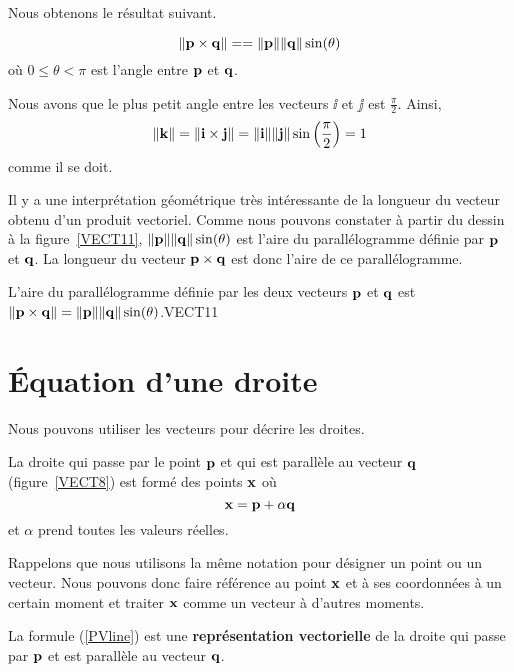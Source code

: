 {Nous obtenons le résultat suivant.

\begin{focus}{\prp}
\[
\| \mathbf{p} \times \mathbf{q} \| = 
= \|\mathbf{p}\| \|\mathbf{q}\| \sin(\theta)
\]
où $0 \leq \theta < \pi$ est l'angle entre $\mathbf{p}$ et $\mathbf{q}$.
\end{focus}

\begin{egg}
Nous avons que le plus petit angle entre les vecteurs $\ii$ et $\jj$ est
$\displaystyle \frac{\pi}{2}$.  Ainsi,
\[
\|\mathbf{k} \| = \| \mathbf{i} \times \mathbf{j} \| = \|\mathbf{i} \| \| \mathbf{j} \|
\sin \left(\frac{\pi}{2}\right) = 1
\]
comme il se doit.
\end{egg}

Il y a une interprétation géométrique très intéressante de la longueur du
vecteur obtenu d'un produit vectoriel.  Comme nous pouvons constater à
partir du dessin à la figure~\ref{VECT11},
$\|\mathbf{p}\| \|\mathbf{q}\| \sin(\theta)$ est
l'aire du parallélogramme définie par $\mathbf{p}$ et $\mathbf{q}$.  La
longueur du vecteur $\mathbf{p}\times \mathbf{q}$ est donc l'aire de ce
parallélogramme.

{L'aire du parallélogramme définie par les deux vecteurs $\mathbf{p}$ et
$\mathbf{q}$ est
$\|\mathbf{p}\times \mathbf{q}\| = \|\mathbf{p}\| \|\mathbf{q}\| \sin(\theta)$.}{VECT11}

\section{Équation d'une droite \eng}

Nous pouvons utiliser les vecteurs pour décrire les droites.

La droite qui passe par le point $\mathbf{p}$ et qui est parallèle au
vecteur $\mathbf{q}$ (figure~\ref{VECT8}) est formé des points
$\mathbf{x}$ où 
\begin{equation}\label{PVline}
\mathbf{x} = \mathbf{p} + \alpha \mathbf{q}
\end{equation}
et $\alpha$ prend toutes les valeurs réelles.

Rappelons que nous utilisons la même notation pour désigner un point ou
un vecteur.  Nous pouvons donc faire référence au point $\mathbf{x}$ et à ses
coordonnées à un certain moment et traiter $\mathbf{x}$ comme un vecteur
à d'autres moments.

\begin{focus}{\dfn} 
La formule (\ref{PVline}) est une {\bfseries représentation
vectorielle} de la droite qui passe par $\mathbf{p}$ et est parallèle au
vecteur $\mathbf{q}$.
\end{focus}

}
